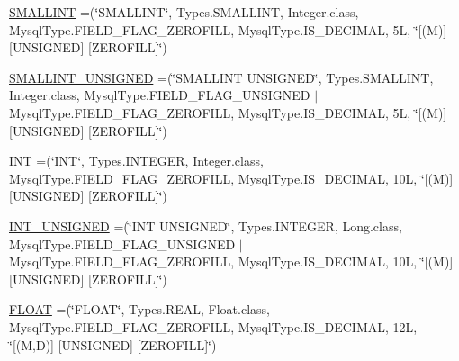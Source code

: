 \begin{DoxyCompactItemize}
\item 
\mbox{\hyperlink{enumcom_1_1mysql_1_1cj_1_1_mysql_type_a6f47bd8cc33374c77f4af4d1b9758081}{S\+M\+A\+L\+L\+I\+NT}} =(\char`\"{}S\+M\+A\+L\+L\+I\+NT\char`\"{}, Types.\+S\+M\+A\+L\+L\+I\+NT, Integer.\+class, Mysql\+Type.\+F\+I\+E\+L\+D\+\_\+\+F\+L\+A\+G\+\_\+\+Z\+E\+R\+O\+F\+I\+LL, Mysql\+Type.\+I\+S\+\_\+\+D\+E\+C\+I\+M\+AL, 5\+L, \char`\"{}\mbox{[}(\+M)\mbox{]} \mbox{[}\+U\+N\+S\+I\+G\+N\+E\+D\mbox{]} \mbox{[}\+Z\+E\+R\+O\+F\+I\+L\+L\mbox{]}\char`\"{})
\item 
\mbox{\hyperlink{enumcom_1_1mysql_1_1cj_1_1_mysql_type_ae37a6ba8bf5532916dded17e40a94216}{S\+M\+A\+L\+L\+I\+N\+T\+\_\+\+U\+N\+S\+I\+G\+N\+ED}} =(\char`\"{}S\+M\+A\+L\+L\+I\+NT U\+N\+S\+I\+G\+N\+ED\char`\"{}, Types.\+S\+M\+A\+L\+L\+I\+NT, Integer.\+class, Mysql\+Type.\+F\+I\+E\+L\+D\+\_\+\+F\+L\+A\+G\+\_\+\+U\+N\+S\+I\+G\+N\+ED $\vert$ Mysql\+Type.\+F\+I\+E\+L\+D\+\_\+\+F\+L\+A\+G\+\_\+\+Z\+E\+R\+O\+F\+I\+LL, Mysql\+Type.\+I\+S\+\_\+\+D\+E\+C\+I\+M\+AL, 5\+L, \char`\"{}\mbox{[}(\+M)\mbox{]} \mbox{[}\+U\+N\+S\+I\+G\+N\+E\+D\mbox{]} \mbox{[}\+Z\+E\+R\+O\+F\+I\+L\+L\mbox{]}\char`\"{})
\item 
\mbox{\hyperlink{enumcom_1_1mysql_1_1cj_1_1_mysql_type_a01116c8fe484233659c251ee68f56d25}{I\+NT}} =(\char`\"{}I\+NT\char`\"{}, Types.\+I\+N\+T\+E\+G\+ER, Integer.\+class, Mysql\+Type.\+F\+I\+E\+L\+D\+\_\+\+F\+L\+A\+G\+\_\+\+Z\+E\+R\+O\+F\+I\+LL, Mysql\+Type.\+I\+S\+\_\+\+D\+E\+C\+I\+M\+AL, 10\+L, \char`\"{}\mbox{[}(\+M)\mbox{]} \mbox{[}\+U\+N\+S\+I\+G\+N\+E\+D\mbox{]} \mbox{[}\+Z\+E\+R\+O\+F\+I\+L\+L\mbox{]}\char`\"{})
\item 
\mbox{\hyperlink{enumcom_1_1mysql_1_1cj_1_1_mysql_type_aa15735863c9115877dc4d1f2c7690035}{I\+N\+T\+\_\+\+U\+N\+S\+I\+G\+N\+ED}} =(\char`\"{}I\+NT U\+N\+S\+I\+G\+N\+ED\char`\"{}, Types.\+I\+N\+T\+E\+G\+ER, Long.\+class, Mysql\+Type.\+F\+I\+E\+L\+D\+\_\+\+F\+L\+A\+G\+\_\+\+U\+N\+S\+I\+G\+N\+ED $\vert$ Mysql\+Type.\+F\+I\+E\+L\+D\+\_\+\+F\+L\+A\+G\+\_\+\+Z\+E\+R\+O\+F\+I\+LL, Mysql\+Type.\+I\+S\+\_\+\+D\+E\+C\+I\+M\+AL, 10\+L, \char`\"{}\mbox{[}(\+M)\mbox{]} \mbox{[}\+U\+N\+S\+I\+G\+N\+E\+D\mbox{]} \mbox{[}\+Z\+E\+R\+O\+F\+I\+L\+L\mbox{]}\char`\"{})
\item 
\mbox{\hyperlink{enumcom_1_1mysql_1_1cj_1_1_mysql_type_ae8cf970114766445c4e064ee748fb74c}{F\+L\+O\+AT}} =(\char`\"{}F\+L\+O\+AT\char`\"{}, Types.\+R\+E\+AL, Float.\+class, Mysql\+Type.\+F\+I\+E\+L\+D\+\_\+\+F\+L\+A\+G\+\_\+\+Z\+E\+R\+O\+F\+I\+LL, Mysql\+Type.\+I\+S\+\_\+\+D\+E\+C\+I\+M\+AL, 12\+L, \char`\"{}\mbox{[}(\+M,\+D)\mbox{]} \mbox{[}\+U\+N\+S\+I\+G\+N\+E\+D\mbox{]} \mbox{[}\+Z\+E\+R\+O\+F\+I\+L\+L\mbox{]}\char`\"{})

\end{DoxyCompactItemize}
